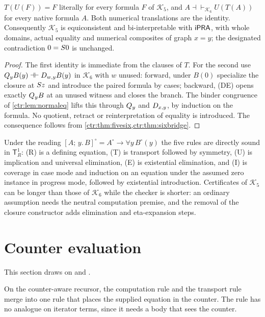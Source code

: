 \begin{theorem}\label{ctr:thm:fivecomp}
$T(U(F))=F$ literally for every formula $F$ of $\mathcal K_5$, and
$A\dashv\vdash_{\mathcal K_6}U(T(A))$ for every native formula $A$. Both numerical
translations are the identity. Consequently $\mathcal K_5$ is equiconsistent and
bi-interpretable with $\mathsf{iPRA}$, with whole domains, actual equality and numerical composites
of graph $x=y$; the designated contradiction $0=S 0$ is unchanged.
\end{theorem}
\begin{proof}
The first identity is immediate from the clauses of $T$. For the second use
$Q_{y}B(y)\dashv\vdash D_{w,y}B(y)$ in $\mathcal K_6$ with $w$ unused: forward, under $B(0)$
specialize the closure at $S z$ and introduce the paired formula by cases; backward, (DE)
opens exactly $Q_{y}B$ at an unused witness and  closes the branch. The
binder congruence of \cref{ctr:lem:normaleq} lifts this through $Q_{y}$ and $D_{x,y}$, by
induction on the formula. No quotient, retract or reinterpretation of equality is
introduced. The consequence follows from \cref{ctr:thm:fivesix,ctr:thm:sixbridge}.
\end{proof}

Under the reading $[A;\,y.\,B]^\circ=A^\circ\to\forall y\,B^\circ(y)$ the five rules are
directly sound in $\mathsf T_R^1$: (R) is a defining equation, (T) is transport followed by
symmetry, (U) is implication and universal elimination, (E) is existential elimination, and
(I) is coverage in case mode and induction on an equation under the assumed zero instance in
progress mode, followed by existential introduction. Certificates of $\mathcal K_5$ can be
longer than those of $\mathcal K_6$ while the checker is shorter: an ordinary assumption
needs the neutral computation premise, and the removal of the closure constructor adds
elimination and eta-expansion steps.

\section{Counter evaluation}\label{ctr:sec:ce}

This section draws on  and .

On the counter-aware recursor, the computation rule and the transport rule merge into one
rule that places the supplied equation in the counter. The rule has no analogue on iterator
terms, since it needs a body that sees the counter.

